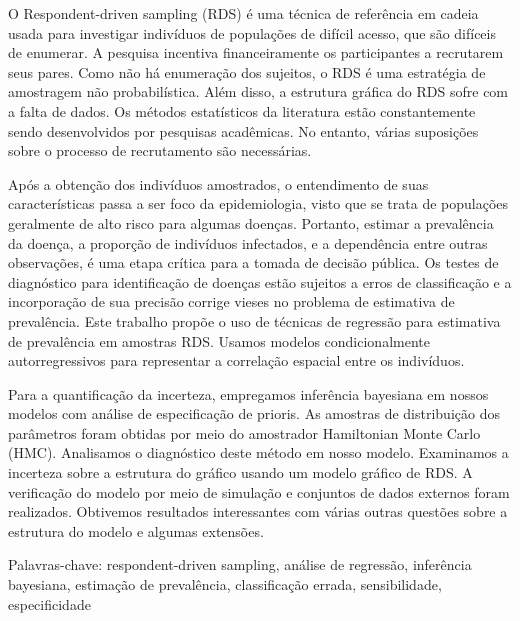 \begin{resumo}[Resumo]
    O Respondent-driven sampling (RDS) é uma técnica de referência em cadeia usada para investigar indivíduos de populações de difícil acesso, que são difíceis de enumerar. A pesquisa incentiva financeiramente os participantes a recrutarem seus pares. Como não há enumeração dos sujeitos, o RDS é uma estratégia de amostragem não probabilística. Além disso, a estrutura gráfica do RDS sofre com a falta de dados. Os métodos estatísticos da literatura estão constantemente sendo desenvolvidos por pesquisas acadêmicas. No entanto, várias suposições sobre o processo de recrutamento são necessárias.

    Após a obtenção dos indivíduos amostrados, o entendimento de suas características passa a ser foco da epidemiologia, visto que se trata de populações geralmente de alto risco para algumas doenças. Portanto, estimar a prevalência da doença, a proporção de indivíduos infectados, e a dependência entre outras observações, é uma etapa crítica para a tomada de decisão pública. Os testes de diagnóstico para identificação de doenças estão sujeitos a erros de classificação e a incorporação de sua precisão corrige vieses no problema de estimativa de prevalência. Este trabalho propõe o uso de técnicas de regressão para estimativa de prevalência em amostras RDS. Usamos modelos condicionalmente autorregressivos para representar a correlação espacial entre os indivíduos.

    Para a quantificação da incerteza, empregamos inferência bayesiana em
    nossos modelos com análise de especificação de prioris. As amostras de
    distribuição dos parâmetros foram obtidas por meio do amostrador
    Hamiltonian Monte Carlo (HMC). Analisamos o diagnóstico deste método
    em nosso modelo. Examinamos a incerteza sobre a estrutura do gráfico
    usando um modelo gráfico de RDS. A verificação do modelo por meio de
    simulação e conjuntos de dados externos foram realizados. Obtivemos
    resultados interessantes com várias outras questões sobre a estrutura do
    modelo e algumas extensões.
    
    Palavras-chave: respondent-driven sampling, análise de regressão,
    inferência bayesiana, estimação de prevalência, classificação errada,
    sensibilidade, especificidade
\end{resumo}